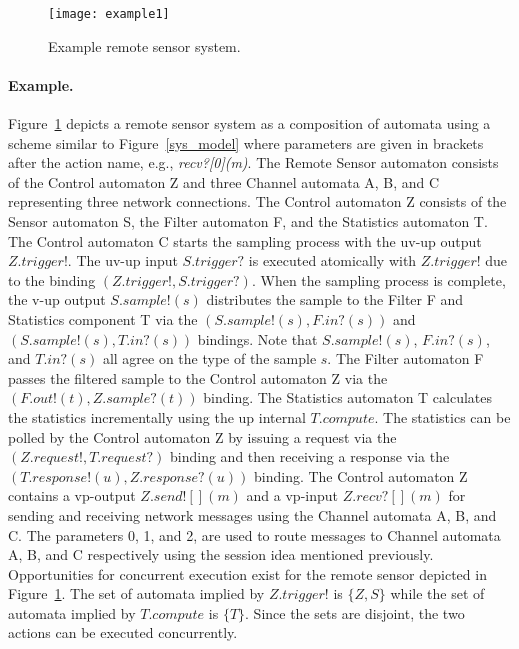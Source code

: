 \begin{figure}
\center
\texttt{[image: example1]}
\caption{Example remote sensor system.}
\label{example1}
\end{figure}

\paragraph*{Example.}
Figure~\ref{example1} depicts a remote sensor system as a composition of automata using a scheme similar to Figure~\ref{sys_model} where parameters are given in brackets after the action name, e.g., \emph{recv?[0](m)}.
The Remote Sensor automaton consists of the Control automaton Z and three Channel automata A, B, and C representing three network connections.
The Control automaton Z consists of the Sensor automaton S, the Filter automaton F, and the Statistics automaton T.
The Control automaton C starts the sampling process with the uv-up output $Z.trigger!$.
The uv-up input $S.trigger?$ is executed atomically with $Z.trigger!$ due to the binding $(Z.trigger!, S.trigger?)$.
When the sampling process is complete, the v-up output $S.sample!(s)$ distributes the sample to the Filter F and Statistics component T via the $(S.sample!(s), F.in?(s))$ and $(S.sample!(s), T.in?(s))$ bindings.
Note that $S.sample!(s)$, $F.in?(s)$, and $T.in?(s)$ all agree on the type of the sample $s$.
The Filter automaton F passes the filtered sample to the Control automaton Z via the $(F.out!(t), Z.sample?(t))$ binding.
The Statistics automaton T calculates the statistics incrementally using the up internal $T.compute$.
The statistics can be polled by the Control automaton Z by issuing a request via the $(Z.request!, T.request?)$ binding and then receiving a response via the $(T.response!(u), Z.response?(u))$ binding.
The Control automaton Z contains a vp-output $Z.send![](m)$ and a vp-input $Z.recv?[](m)$ for sending and receiving network messages using the Channel automata A, B, and C.
The parameters 0, 1, and 2, are used to route messages to Channel automata A, B, and C respectively using the session idea mentioned previously.
Opportunities for concurrent execution exist for the remote sensor depicted in Figure~\ref{example1}.
The set of automata implied by $Z.trigger!$ is $\{Z, S\}$ while the set of automata implied by $T.compute$ is $\{T\}$.
Since the sets are disjoint, the two actions can be executed concurrently.
\fi


